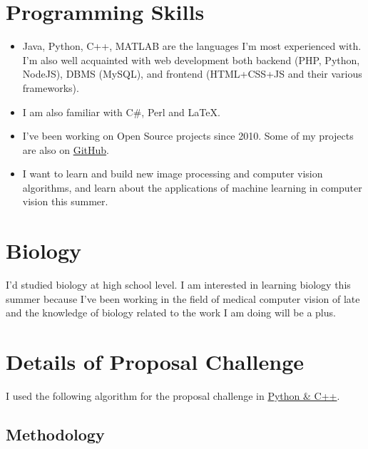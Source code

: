 \documentclass[runningheads,a4paper]{llncs}
\begin{document}
\section{Programming Skills}

\begin{itemize}
\item Java, Python, C++, MATLAB are the languages I'm most experienced with. I'm also well acquainted with web development both backend (PHP, Python, NodeJS), DBMS (MySQL), and frontend (HTML+CSS+JS and their various frameworks). 
\item I am also familiar with C\#, Perl and \LaTeX.
\item I've been working on Open Source projects since 2010. Some of my projects are also on \href{https://github.com/abdulfatir}{GitHub}.
\item I want to learn and build new image processing and computer vision algorithms, and learn about the applications of machine learning in computer vision this summer.
\end{itemize}

\section{Biology}

I'd studied biology at high school level. I am interested in learning biology this summer because I've been working in the field of medical computer vision of late and the knowledge of biology related to the work I am doing will be a plus.

\section{Details of Proposal Challenge}

I used the following algorithm for the proposal challenge in \href{https://www.dropbox.com/sh/xfpl8xw6l91yubo/AACRVdraU5jr7qRxJeZAv1hpa?dl=0}{Python \& C++}. 

\subsection{Methodology}
\end{document}

